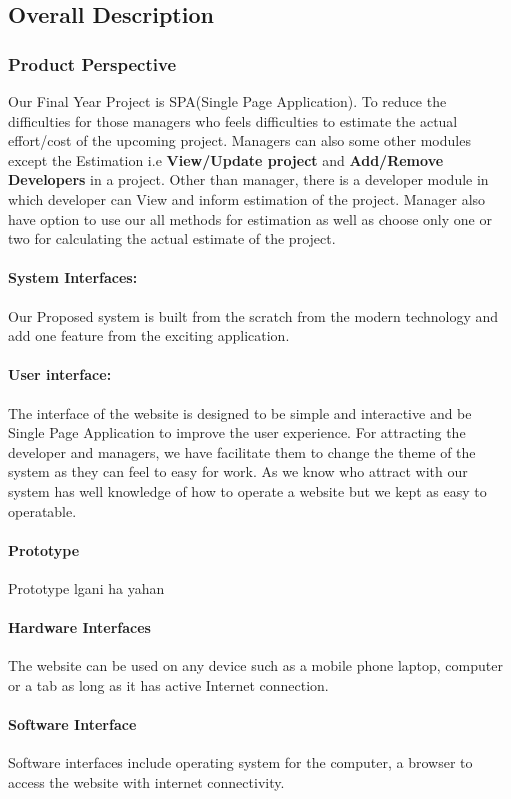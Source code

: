 \subsection{Overall Description}
\subsubsection{Product Perspective}
Our Final Year Project is SPA(Single Page Application). To reduce the difficulties for those managers who feels 
difficulties to estimate the actual effort/cost of the upcoming project. Managers can also some other modules except
the Estimation i.e {\bfseries View/Update project} and {\bfseries Add/Remove Developers} in a project. Other than manager, there is a developer module in which developer 
can View and inform estimation of the project. Manager also have option to use our all methods for estimation as well as choose only one or two for calculating the actual estimate of the project.

    \paragraph{System Interfaces:}
    Our Proposed system is built from the scratch from the modern technology and add one feature from the exciting application. 
    \paragraph{User interface: }
    The interface of the website is designed to be simple and interactive and be Single Page Application to improve the user experience. 
    For attracting the developer and managers, we have facilitate them to change the theme of the system as they can feel to easy for work.
    As we know who attract with our system has well knowledge of how to operate a website but we kept as easy to operatable.
    \paragraph{Prototype}
    {\huge Prototype lgani ha yahan}
    \paragraph{Hardware Interfaces}
    The website can be used on any device such as a mobile phone laptop, computer or a tab as long as it has active Internet connection.
    \paragraph{Software Interface}
    Software interfaces include operating system for the computer, a browser to access the website with internet connectivity.
